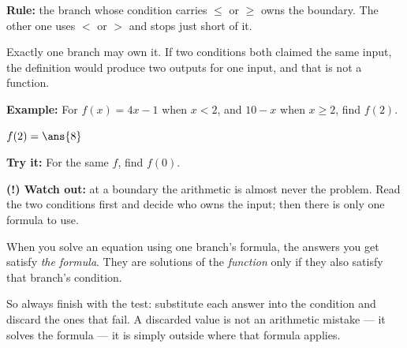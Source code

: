 \documentclass[12pt]{article}
\begin{document}


\begin{formulabox}
\textbf{Rule:} \quad the branch whose condition carries $\le$ or $\ge$ owns the boundary. The other one uses $<$ or $>$ and stops just short of it.\par\smallskip
Exactly one branch may own it. If two conditions both claimed the same input, the definition would produce two outputs for one input, and that is not a function.
\end{formulabox}

\begin{examplebox}
\textbf{Example:} \quad For $f(x) = 4x - 1$ when $x < 2$, and $10 - x$ when $x \ge 2$, find $f(2)$.
\par
$f(2) = \ans{8}$
\end{examplebox}

\begin{tryitbox}
\textbf{Try it:} \quad For the same $f$, find $f(0)$.\\[2pt]
\end{tryitbox}

\begin{watchoutbox}
\textbf{(!) Watch out:} at a boundary the arithmetic is almost never the problem. Read the two conditions first and decide who owns the input; then there is only one formula to use.
\end{watchoutbox}


\begin{formulabox}
When you solve an equation using one branch's formula, the answers you get satisfy \emph{the formula}. They are solutions of the \emph{function} only if they also satisfy that branch's condition.\par\smallskip
So always finish with the test: substitute each answer into the condition and discard the ones that fail. A discarded value is not an arithmetic mistake --- it solves the formula --- it is simply outside where that formula applies.
\end{formulabox}
\end{document}
